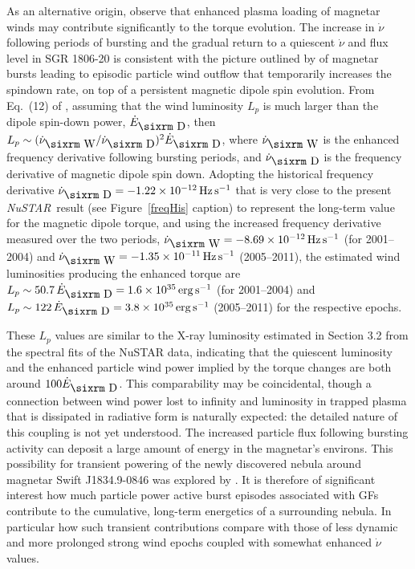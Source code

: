 \documentclass[twocolumn]{aastex6}
\newcommand {\nustar} {\textsl{NuSTAR}}
\def\nudotW{\dot{\nu}_{\hbox{\sixrm W}}}
\def\nudotD{\dot{\nu}_{\hbox{\sixrm D}}}
\def\EdotD{\dot{E}_{\hbox{\sixrm D}}}
\begin{document}
As an alternative origin, observe that
enhanced plasma loading of magnetar winds may contribute significantly
to the torque evolution.  The increase in $\dot \nu$ following periods
of bursting and the gradual return to a quiescent $\dot \nu$ and flux
level in SGR 1806-20 is consistent with the picture outlined by
\citet[][see also \citealt{tong13ApJ:wind}]{harding99ApJ:mag} of
magnetar bursts leading to episodic particle wind outflow that
temporarily increases the spindown rate, on top of a persistent
magnetic dipole spin evolution. From Eq.~(12) of
\citet{harding99ApJ:mag}, assuming that the wind luminosity $L_p$ is
much larger than the dipole spin-down power, $\EdotD$, then $L_p
\sim (\nudotW/\nudotD)^2 \EdotD$, where $\nudotW$ is the
enhanced frequency derivative following bursting periods, and 
$\nudotD$ is the frequency derivative of magnetic dipole spin down.
Adopting the historical frequency derivative $\nudotD = -1.22
\times 10^{-12}\,\rm Hz\,s^{-1}$ that is very close to the present
\nustar\ result (see Figure~\ref{freqHis} caption) to represent the
long-term value for the magnetic dipole torque, and using the
increased frequency derivative measured over the two periods, 
$\nudotW = -8.69 \times 10^{-12}\,\rm Hz\,s^{-1}$ (for 2001--2004) and
$\nudotW = -1.35 \times 10^{-11}\,\rm Hz\,s^{-1}$ (2005--2011), the
estimated wind luminosities producing the enhanced torque are $L_p
\sim 50.7\,\EdotD = 1.6 \times 10^{35}\,\rm erg\,s^{-1}$ (for
2001--2004) and $L_p \sim 122\,\EdotD = 3.8 \times 10^{35}\,\rm
erg\,s^{-1}$ (2005--2011) for the respective epochs.  

These $L_p$ values are
similar to the X-ray luminosity estimated in Section 3.2 from the spectral
fits of the NuSTAR data, indicating that the quiescent luminosity and
the enhanced particle wind power implied by the torque changes are
both around $100 \EdotD$.  This comparability may be 
coincidental, though a connection between wind power lost to infinity
and luminosity in trapped plasma that is dissipated in radiative form 
is naturally expected: the detailed nature of this coupling is 
not yet understood.  The increased particle flux following
bursting activity can deposit a large amount of energy in the
magnetar's environs. This possibility for transient powering of the
newly discovered nebula around magnetar Swift J1834.9-0846
\citep{younes12ApJ:1834,younes16ApJ:1834} was explored by
\citet{granot17:1834}.  It is therefore of significant interest how 
much particle power active burst episodes associated with GFs contribute 
to the cumulative, long-term energetics of a surrounding nebula.
In particular how such transient contributions compare with 
those of less dynamic and more prolonged strong wind 
epochs coupled with somewhat enhanced $\dot{\nu}$ values.
\end{document}
